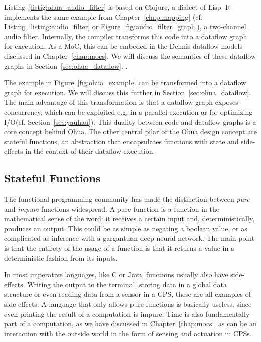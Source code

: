 Listing~\ref{listig:ohua_audio_filter} is based on Clojure, a dialect of Lisp.
It implements the same example from Chapter~\ref{chap:mapping} (cf. Listing~\ref{listing:audio_filter} or Figure~\ref{fig:audio_filter_graph}), a two-channel audio filter.
Internally, the compiler transforms this code into a dataflow graph for execution.
As a \ac{MoC}, this can be embeded in the Dennis dataflow models discussed in Chapter~\ref{chap:mocs}.
We will discuss the semantics of these dataflow graphs in Section~\ref{sec:ohua_dataflow}.
.

The example in Figure~\ref{fig:ohua_example} can be transformed into a dataflow graph for execution. We will discuss this further in Section~\ref{sec:ohua_dataflow}.
The main advantage of this transformation is that a dataflow graph exposes concurrency, which can be exploited e.g. in a parallel execution or for optimizing \ac{I/O}(cf. Section~\ref{sec:yauhau}).
This duality between code and dataflow graphs is a core concept behind Ohua.
The other central pilar of the Ohua design concept are stateful functions, an abstraction that encapsulates functions with state and side-effects in the context of their dataflow execution.

\subsection{Stateful Functions}
The functional programming community has made the distinction between \emph{pure} and \emph{impure} functions widespread.
A pure function is a function in the mathematical sense of the word: it receives a certain input and, deterministically, produces an output.
This could be as simple as negating a boolean value, or as complicated as inference with a gargantuan deep neural network.
The main point is that the entirety of the usage of a function is that it returns a value in a deterministic fashion from its inputs.

In most imperative languages, like C or Java, functions usually also have side-effects. Writing the output to the terminal, storing data in a global data structure or even reading data from a sensor in a \ac{CPS}, these are all examples of side effects.
A language that only allows pure functions is basically useless, since even printing the result of a computation is impure.
Time is also fundamentally part of a computation, as we have discussed in Chapter~\ref{chap:mocs}, as can be an interaction with the outside world in the form of sensing and actuation in \acp{CPS}.

